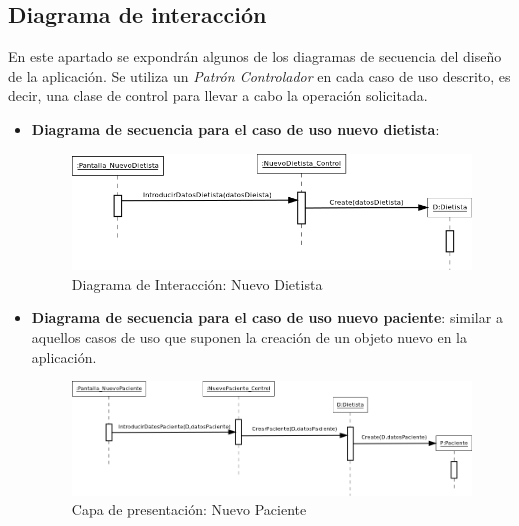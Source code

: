\subsection{Diagrama de interacción}
En este apartado se expondrán algunos de los diagramas de secuencia del diseño de la aplicación. Se utiliza un \textit{Patrón Controlador} en cada caso de uso descrito, es decir, una clase de control para llevar a cabo la operación solicitada.
\begin{itemize}
\item \textbf{Diagrama de secuencia para el caso de uso nuevo dietista}:
\begin{figure}[H]
  \label{ndiet}
  \begin{center}
    \includegraphics[scale=0.5]{../img/DI_NuevoDietista.png}
  \end{center}
  \caption{Diagrama de Interacción: Nuevo Dietista}
\end{figure}

\item \textbf{Diagrama de secuencia para el caso de uso nuevo paciente}: similar a aquellos casos de uso que suponen la creación de un objeto nuevo en la aplicación.
\begin{figure}[H]
  \label{npaciente}
  \begin{center}
    \includegraphics[scale=0.4]{../img/DI_NuevoPaciente.png}
  \end{center}
  \caption{Capa de presentación: Nuevo Paciente}
\end{figure}
\end{itemize}

